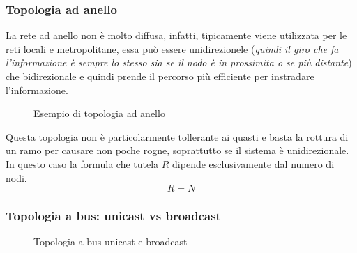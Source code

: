 \documentclass{book}
\begin{document}
\subsubsection{Topologia ad anello}
\label{sec:topadan}
La rete ad anello non è molto diffusa, infatti, tipicamente viene utilizzata per
le reti locali e metropolitane, essa può essere unidirezionele ({\it quindi il giro che
  fa l'informazione è sempre lo stesso sia se il nodo è in prossimita o se più
  distante}) che bidirezionale e quindi prende il percorso più efficiente per instradare
l'informazione.
\begin{figure}[ht]
  \centering
  
  \caption{Esempio di topologia ad anello}
  \label{fig:topologiaadanello}
\end{figure}
Questa topologia non è particolarmente tollerante ai quasti e basta la rottura di un
ramo per causare non poche rogne, soprattutto se il sistema è unidirezionale. In questo caso
la formula che tutela $R$ dipende esclusivamente dal numero di nodi.
\begin{equation}
  \label{eq:adanallo}
  R=N
\end{equation}

\subsubsection{Topologia a bus: unicast vs broadcast}
\label{sec:unicvsbroadcast}
\begin{figure}[ht]
  \centering
  
  \caption{Topologia a bus unicast e broadcast}
  \label{fig:topologiaadanello}
\end{figure}
\end{document}
